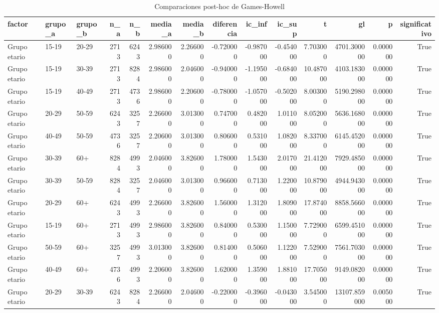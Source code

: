 \begin{table}[htbp]
\caption{Comparaciones post-hoc de Games-Howell}
\label{tab:tabla_17_posthoc_games_howell}
\begin{tabular}{lllrrrrrrrrrrr}
\toprule
factor & grupo\_a & grupo\_b & n\_a & n\_b & media\_a & media\_b & diferencia & ic\_inf & ic\_sup & t & gl & p & significativo \\
\midrule
Grupo etario & 15-19 & 20-29 & 2713 & 6243 & 2.986000 & 2.266000 & -0.720000 & -0.987000 & -0.454000 & 7.703000 & 4701.300000 & 0.000000 & True \\
Grupo etario & 15-19 & 30-39 & 2713 & 8284 & 2.986000 & 2.046000 & -0.940000 & -1.195000 & -0.684000 & 10.487000 & 4103.183000 & 0.000000 & True \\
Grupo etario & 15-19 & 40-49 & 2713 & 4736 & 2.986000 & 2.206000 & -0.780000 & -1.057000 & -0.502000 & 8.003000 & 5190.298000 & 0.000000 & True \\
Grupo etario & 20-29 & 50-59 & 6243 & 3257 & 2.266000 & 3.013000 & 0.747000 & 0.482000 & 1.011000 & 8.052000 & 5636.168000 & 0.000000 & True \\
Grupo etario & 40-49 & 50-59 & 4736 & 3257 & 2.206000 & 3.013000 & 0.806000 & 0.531000 & 1.082000 & 8.337000 & 6145.452000 & 0.000000 & True \\
Grupo etario & 30-39 & 60+ & 8284 & 4993 & 2.046000 & 3.826000 & 1.780000 & 1.543000 & 2.017000 & 21.412000 & 7929.485000 & 0.000000 & True \\
Grupo etario & 30-39 & 50-59 & 8284 & 3257 & 2.046000 & 3.013000 & 0.966000 & 0.713000 & 1.220000 & 10.879000 & 4944.943000 & 0.000000 & True \\
Grupo etario & 20-29 & 60+ & 6243 & 4993 & 2.266000 & 3.826000 & 1.560000 & 1.312000 & 1.809000 & 17.874000 & 8858.566000 & 0.000000 & True \\
Grupo etario & 15-19 & 60+ & 2713 & 4993 & 2.986000 & 3.826000 & 0.840000 & 0.530000 & 1.150000 & 7.729000 & 6599.451000 & 0.000000 & True \\
Grupo etario & 50-59 & 60+ & 3257 & 4993 & 3.013000 & 3.826000 & 0.814000 & 0.506000 & 1.122000 & 7.529000 & 7561.703000 & 0.000000 & True \\
Grupo etario & 40-49 & 60+ & 4736 & 4993 & 2.206000 & 3.826000 & 1.620000 & 1.359000 & 1.881000 & 17.705000 & 9149.082000 & 0.000000 & True \\
Grupo etario & 20-29 & 30-39 & 6243 & 8284 & 2.266000 & 2.046000 & -0.220000 & -0.396000 & -0.043000 & 3.545000 & 13107.859000 & 0.005000 & True \\

\end{tabular}
\end{table}

